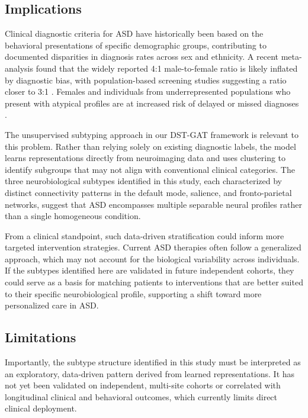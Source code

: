 \documentclass[10pt]{article}
\begin{document}
\subsection{Implications}
Clinical diagnostic criteria for ASD have historically been based on the behavioral presentations of specific demographic groups, contributing to documented disparities in diagnosis rates across sex and ethnicity. A recent meta-analysis found that the widely reported 4:1 male-to-female ratio is likely inflated by diagnostic bias, with population-based screening studies suggesting a ratio closer to 3:1 \parencite{loomes2017male}. Females and individuals from underrepresented populations who present with atypical profiles are at increased risk of delayed or missed diagnoses \parencite{lai2019sex}.

The unsupervised subtyping approach in our DST-GAT framework is relevant to this problem. Rather than relying solely on existing diagnostic labels, the model learns representations directly from neuroimaging data and uses clustering to identify subgroups that may not align with conventional clinical categories. The three neurobiological subtypes identified in this study, each characterized by distinct connectivity patterns in the default mode, salience, and fronto-parietal networks, suggest that ASD encompasses multiple separable neural profiles rather than a single homogeneous condition.

From a clinical standpoint, such data-driven stratification could inform more targeted intervention strategies. Current ASD therapies often follow a generalized approach, which may not account for the biological variability across individuals. If the subtypes identified here are validated in future independent cohorts, they could serve as a basis for matching patients to interventions that are better suited to their specific neurobiological profile, supporting a shift toward more personalized care in ASD.

\subsection{Limitations}
Importantly, the subtype structure identified in this study must be interpreted as an exploratory, data-driven pattern derived from learned representations. It has not yet been validated on independent, multi-site cohorts or correlated with longitudinal clinical and behavioral outcomes, which currently limits direct clinical deployment.

\end{document}
